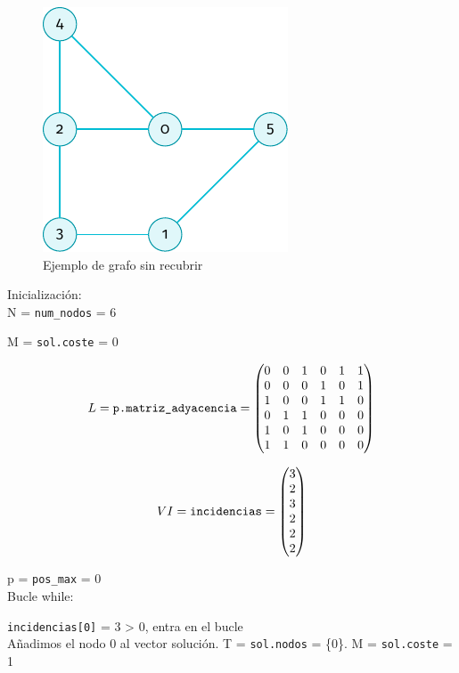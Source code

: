 \documentclass[11pt]{article}
\begin{document}
\begin{figure}[H]
	\caption{Ejemplo de grafo sin recubrir}
	\centering \includegraphics{./img/grafo-ejemplo-sin-recubrir.pdf}
\end{figure}

Inicialización:\\
N = \verb|num_nodos| = 6

M = \verb|sol.coste| = 0

$$  L = \verb|p.matriz_adyacencia| = 
\begin{pmatrix}
	0 & 0 & 1 & 0 & 1 & 1 \\
	0 & 0 & 0 & 1 & 0 & 1 \\
	1 & 0 & 0 & 1 & 1 & 0 \\
	0 & 1 & 1 & 0 & 0 & 0 \\
	1 & 0 & 1 & 0 & 0 & 0 \\
	1 & 1 & 0 & 0 & 0 & 0
\end{pmatrix}$$

$$ VI = \verb|incidencias| = 
\begin{pmatrix}
	3 \\
	2 \\
	3 \\
	2 \\
	2 \\
	2 
\end{pmatrix}$$

p = \verb|pos_max| = 0\\

Bucle while:

\verb|incidencias[0]| = 3 > 0, entra en el bucle\\
Añadimos el nodo 0 al vector solución. T = \verb|sol.nodos| = \{0\}. 
M = \verb|sol.coste| = 1\\
\end{document}
